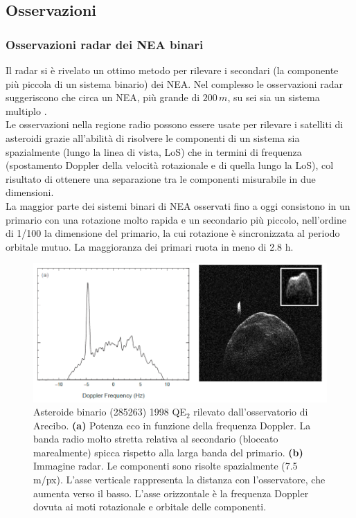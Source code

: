 \subsection{Osservazioni}
\subsubsection{Osservazioni radar dei NEA binari}
Il radar si è rivelato un ottimo metodo per rilevare i secondari (la componente più piccola di un sistema binario) dei NEA. Nel complesso le osservazioni radar suggeriscono che circa un NEA, più grande di $200\,m$, su sei sia un sistema multiplo \citep{taylor_shape_2012}.\\
Le osservazioni nella regione radio possono essere usate per rilevare i satelliti di asteroidi grazie all'abilità di risolvere le componenti di un sistema sia spazialmente (lungo la linea di vista, LoS) che in termini di frequenza (spostamento Doppler della velocità rotazionale e di quella lungo la LoS), col risultato di ottenere una separazione tra le componenti misurabile in due dimensioni.\\
La maggior parte dei sistemi binari di NEA osservati fino a oggi consistono in un primario con una rotazione molto rapida e un secondario più piccolo, nell'ordine di 1/100 la dimensione del primario, la cui rotazione è sincronizzata al periodo orbitale mutuo. La maggioranza dei primari ruota in meno di 2.8 h.

\begin{figure}[!h]
    \centering
    \includegraphics[scale=0.4]{figure/radar_image.png}
    \caption[Asteroide binario (285263) 1998 QE$_2$ rilevato dall'osservatorio di Arecibo.]{Asteroide binario (285263) 1998 QE$_2$ rilevato dall'osservatorio di Arecibo. \textbf{(a)} Potenza eco in funzione della frequenza Doppler. La banda radio molto stretta relativa al secondario (bloccato marealmente) spicca rispetto alla larga banda del primario. \textbf{(b)} Immagine radar. Le componenti sono risolte spazialmente (7.5 m/px). L'asse verticale rappresenta la distanza con l'osservatore, che aumenta verso il basso. L'asse orizzontale è la frequenza Doppler dovuta ai moti rotazionale e orbitale delle componenti. \citep{michel_asteroid_2015-1}}
    \label{fig:radar_image}
\end{figure}

